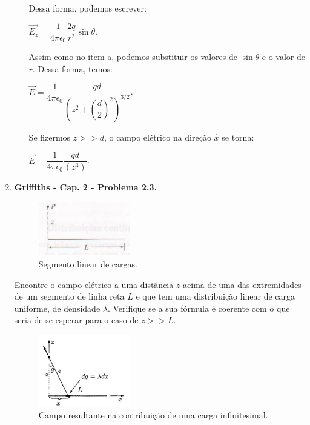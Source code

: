 \documentclass[11pt,a4paper]{article}
\begin{document}
\begin{enumerate}
\begin{enumerate}
Dessa forma, podemos escrever:

\begin{center}
$\vec{E_z} = \displaystyle\dfrac{1}{4 \pi \epsilon_0} \displaystyle\dfrac{2q}{r^2}\sin \theta $.
\end{center}

Assim como no item a, podemos substituir os valores de $\sin \theta$ e o valor de $r$. Dessa forma, temos:

\begin{center}
$\vec{E} = \displaystyle\dfrac{1}{4 \pi \epsilon_0} \displaystyle\dfrac{qd}{\left(z^2 + \left(\displaystyle\dfrac{d}{2}\right)^2\right)^{3/2}}$.
\end{center}

Se fizermos $z >> d$, o campo elétrico na direção $\hat{x}$ se torna:

\begin{center}

$\vec{E} = \displaystyle\dfrac{1}{4 \pi \epsilon_0} \displaystyle\dfrac{qd}{\left(z^3\right)}$.

\end{center}

\end{enumerate}

\item \textbf{Griffiths - Cap. 2 - Problema 2.3.}

\begin{figure}[h]	
\centering %
\includegraphics[width=4cm]{Selection_071.jpg} 
\caption{Segmento linear de cargas.}
\end{figure}

Encontre o campo elétrico a uma distância $z$ acima de uma das extremidades de um segmento de linha reta $L$ e que tem uma distribuição linear de carga uniforme, de densidade $\lambda$. Verifique se a sua fórmula é coerente com o que seria de se esperar para o caso de $z >> L$.

\begin{figure}[h]	
\centering %
\includegraphics[width=4cm]{Selection_075.jpg} 
\caption{Campo resultante na contribuição de uma carga infinitesimal.}
\end{figure}


\end{enumerate}
\end{document}
